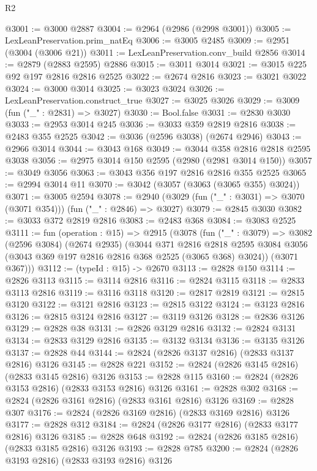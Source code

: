 \begin{lexlean}{R2}
\begin{coremodule}
@3001 := @3000 @2887
@3004 := @2964 (@2986 (@2998 @3001))
@3005 := LexLeanPreservation.prim_natEq
@3006 := @3005 @2485
@3009 := @2951 (@3004 (@3006 @21))
@3011 := LexLeanPreservation.conv_build @2856
@3014 := @2879 (@2883 @2595) @2886
@3015 := @3011 @3014
@3021 := @3015 @225 @92 @197 @2816 @2816 @2525
@3022 := @2674 @2816
@3023 := @3021 @3022
@3024 := @3000 @3014
@3025 := @3023 @3024
@3026 := LexLeanPreservation.construct_true
@3027 := @3025 @3026
@3029 := @3009 (fun ("_" : @2831) => @3027)
@3030 := Bool.false
@3031 := @2830 @3030
@3033 := @2953 @3014 @245
@3036 := @3033 @359 @2819 @2816
@3038 := @2483 @355 @2525
@3042 := @3036 (@2596 @3038) (@2674 @2946)
@3043 := @2966 @3014
@3044 := @3043 @168
@3049 := @3044 @358 @2816 @2818 @2595 @3038
@3056 := @2975 @3014 @150 @2595 (@2980 (@2981 @3014 @150))
@3057 := @3049 @3056
@3063 := @3043 @356 @197 @2816 @2816 @355 @2525
@3065 := @2994 @3014 @11
@3070 := @3042 (@3057 (@3063 (@3065 @355) @3024))
@3071 := @3005 @2594
@3078 := @2940 (@3029 (fun ("_" : @3031) => @3070 (@3071 @354))) (fun ("_" : @2846) => @3027)
@3079 := @2845 @3030
@3082 := @3033 @372 @2819 @2816
@3083 := @2483 @368
@3084 := @3083 @2525
@3111 := fun (operation : @15) =>
  @2915
    (@3078
      (fun ("_" : @3079) =>
      @3082
        (@2596 @3084)
        (@2674 @2935)
        (@3044
          @371
          @2816
          @2818
          @2595
          @3084
          @3056
          (@3043 @369 @197 @2816 @2816 @368 @2525 (@3065 @368) @3024))
        (@3071 @367)))
@3112 := (typeId : @15) -> @2670
@3113 := @2828 @150
@3114 := @2826 @3113
@3115 := @3114 @2816
@3116 := @2824 @3115
@3118 := @2833 @3113 @2816
@3119 := @3116 @3118
@3120 := @2817 @2819
@3121 := @2815 @3120
@3122 := @3121 @2816
@3123 := @2815 @3122
@3124 := @3123 @2816
@3126 := @2815 @3124 @2816
@3127 := @3119 @3126
@3128 := @2836 @3126
@3129 := @2828 @38
@3131 := @2826 @3129 @2816
@3132 := @2824 @3131
@3134 := @2833 @3129 @2816
@3135 := @3132 @3134
@3136 := @3135 @3126
@3137 := @2828 @44
@3144 := @2824 (@2826 @3137 @2816) (@2833 @3137 @2816) @3126
@3145 := @2828 @221
@3152 := @2824 (@2826 @3145 @2816) (@2833 @3145 @2816) @3126
@3153 := @2828 @115
@3160 := @2824 (@2826 @3153 @2816) (@2833 @3153 @2816) @3126
@3161 := @2828 @302
@3168 := @2824 (@2826 @3161 @2816) (@2833 @3161 @2816) @3126
@3169 := @2828 @307
@3176 := @2824 (@2826 @3169 @2816) (@2833 @3169 @2816) @3126
@3177 := @2828 @312
@3184 := @2824 (@2826 @3177 @2816) (@2833 @3177 @2816) @3126
@3185 := @2828 @648
@3192 := @2824 (@2826 @3185 @2816) (@2833 @3185 @2816) @3126
@3193 := @2828 @785
@3200 := @2824 (@2826 @3193 @2816) (@2833 @3193 @2816) @3126

\end{coremodule}
\end{lexlean}
